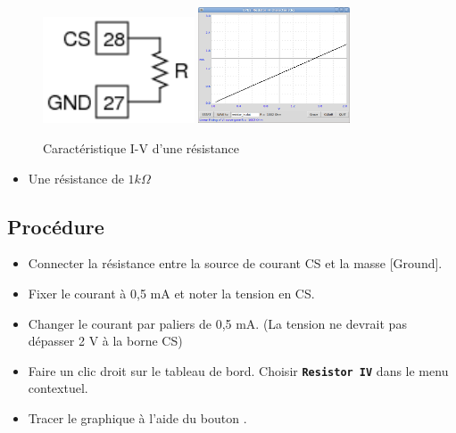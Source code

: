 \documentclass{book}
\newcommand{\nop}{}
\begin{document}
\begin{figure}[h!]
\begin{center}
\caption{\label{fig:I-V-of-resistor}Caractéristique I-V d'une résistance }\vspace{0.5em}
\includegraphics[width=0.4\textwidth, height=0.3\textwidth, keepaspectratio]{Schematic-res-measure.png}
\includegraphics[width=0.4\textwidth, height=0.3\textwidth, keepaspectratio]{Pic-resistor-iv.png}
\end{center}
\end{figure}



\begin{itemize}
  \item Une résistance de $1 k\Omega$
\end{itemize}

\subsection{Procédure}


\begin{itemize}
  \item Connecter la résistance entre la source de courant CS et la masse [Ground].
  \item Fixer le courant à 0,5 mA et noter la tension en CS.
  \item Changer le courant par paliers de 0,5 mA. (La tension ne devrait pas dépasser 2 V à la borne CS)
  \item Faire un clic droit sur le tableau de bord. Choisir  \texttt{\textbf{Resistor IV}\nop} dans le menu contextuel.
  \item Tracer le graphique à l'aide du bouton  .
\end{itemize}
\end{document}
